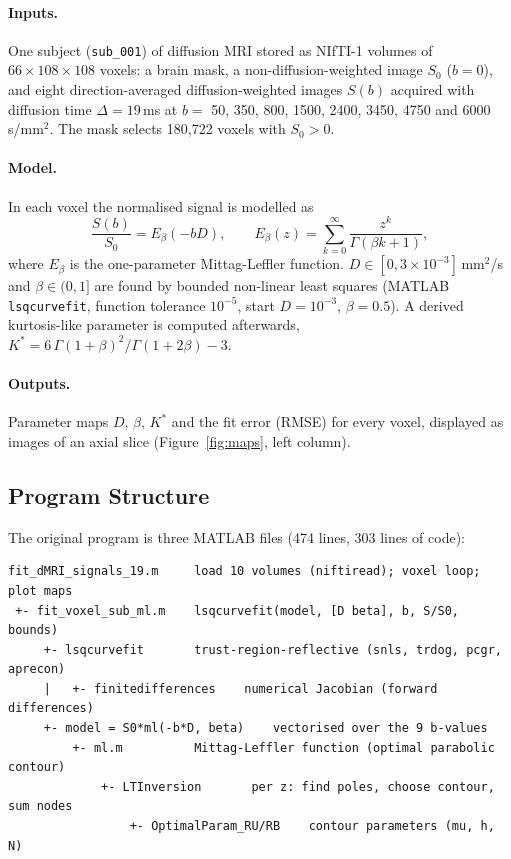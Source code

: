 \documentclass[11pt]{article}
\begin{document}
\paragraph{Inputs.} One subject (\texttt{sub\_001}) of diffusion MRI stored as NIfTI-1
volumes of $66 \times 108 \times 108$ voxels: a brain mask, a non-diffusion-weighted image
$S_0$ ($b = 0$), and eight direction-averaged diffusion-weighted images $S(b)$ acquired with
diffusion time $\Delta = 19$\,ms at $b =$ 50, 350, 800, 1500, 2400, 3450, 4750 and
6000\,s/mm$^2$. The mask selects 180,722 voxels with $S_0 > 0$.

\paragraph{Model.} In each voxel the normalised signal is modelled as
\begin{equation}
    \frac{S(b)}{S_0} = E_\beta(-bD), \qquad
    E_\beta(z) = \sum_{k=0}^{\infty} \frac{z^k}{\Gamma(\beta k + 1)},
\end{equation}
where $E_\beta$ is the one-parameter Mittag-Leffler function. $D \in [0, 3\times10^{-3}]$\,mm$^2$/s
and $\beta \in (0, 1]$ are found by bounded non-linear least squares (MATLAB
\texttt{lsqcurvefit}, function tolerance $10^{-5}$, start $D = 10^{-3}$, $\beta = 0.5$).
A derived kurtosis-like parameter is computed afterwards,
$K^* = 6\,\Gamma(1+\beta)^2 / \Gamma(1+2\beta) - 3$.

\paragraph{Outputs.} Parameter maps $D$, $\beta$, $K^*$ and the fit error (RMSE) for every
voxel, displayed as images of an axial slice (Figure~\ref{fig:maps}, left column).

\subsection{Program Structure}

The original program is three MATLAB files (474 lines, 303 lines of code):

\begin{lstlisting}[numbers=none, frame=none, basicstyle=\ttfamily\scriptsize]
fit_dMRI_signals_19.m     load 10 volumes (niftiread); voxel loop; plot maps
 +- fit_voxel_sub_ml.m    lsqcurvefit(model, [D beta], b, S/S0, bounds)
     +- lsqcurvefit       trust-region-reflective (snls, trdog, pcgr, aprecon)
     |   +- finitedifferences    numerical Jacobian (forward differences)
     +- model = S0*ml(-b*D, beta)    vectorised over the 9 b-values
         +- ml.m          Mittag-Leffler function (optimal parabolic contour)
             +- LTInversion       per z: find poles, choose contour, sum nodes
                 +- OptimalParam_RU/RB    contour parameters (mu, h, N)
\end{lstlisting}
\end{document}
